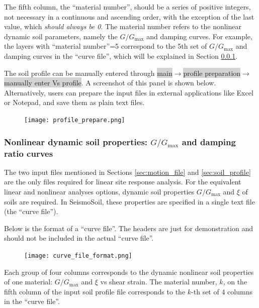 \documentclass[11pt,letterpaper]{article}
\newcommand{\panel}[1]{\colorbox{lightgray}{\textsf{#1}}}
\begin{document}
The fifth column, the ``material number'', should be a series of positive integers, not necessary in a continuous and ascending order, with the exception of the last value, which \emph{should always be 0}. The material number refers to the nonlinear dynamic soil parameters, namely the $G/G_{\max}$ and damping curves. For example, the layers with ``material number''=5 correspond to the 5th set of $G/G_{\max}$ and damping curves in the ``curve file'', which will be explained in Section \ref{sec:curve}.

The soil profile can be manually entered through \panel{main}$\rightarrow$\panel{profile preparation}$\rightarrow$\panel{manually enter Vs profile}. A screenshot of this panel is shown below.  Alternatively, users can prepare the input files in external applications like Excel or Notepad, and save them as plain text files.

\begin{figure}[H]
\centering
  \texttt{[image: profile\_prepare.png]}\\
\end{figure}

\subsubsection{Nonlinear dynamic soil properties: $G/G_{\max}$ and damping ratio curves}\label{sec:curve}

The two input files mentioned in Sections \ref{sec:motion_file} and \ref{sec:soil_profile} are the only files required for linear site response analysis. For the equivalent linear and nonlinear analyses options, dynamic soil properties $G/G_{\max}$ and $\xi$ of soils are required. In SeismoSoil, these properties are specified in a single text file (the ``curve file'').

Below is the format of a ``curve file''. The headers are just for demonstration and should not be included in the actual ``curve file''.

\begin{figure}[H]
\centering
  \texttt{[image: curve\_file\_format.png]}\\
\end{figure}

Each group of four columns corresponds to the dynamic nonlinear soil properties of one material: $G/G_{\max}$ and $\xi$ vs shear strain. The material number, $k$, on the fifth column of the input soil profile file corresponds to the $k$-th set of 4 columns in the ``curve file''.
\end{document}
